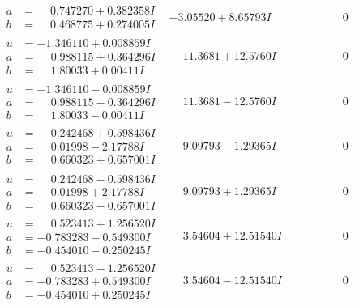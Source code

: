 \documentclass[1p]{elsarticle_modified}
\theoremstyle{definition}
\begin{document}
$$\begin{array}{c|c|c}
\begin{aligned}
a &= \phantom{-}0.747270 + 0.382358 I \\
b &= \phantom{-}0.468775 + 0.274005 I\end{aligned}
 & -3.05520 + 8.65793 I & \phantom{-0.000000 } 0 \\ \hline\begin{aligned}
u &= -1.346110 + 0.008859 I \\
a &= \phantom{-}0.988115 + 0.364296 I \\
b &= \phantom{-}1.80033 + 0.00411 I\end{aligned}
 & \phantom{-}11.3681 + 12.5760 I & \phantom{-0.000000 } 0 \\ \hline\begin{aligned}
u &= -1.346110 - 0.008859 I \\
a &= \phantom{-}0.988115 - 0.364296 I \\
b &= \phantom{-}1.80033 - 0.00411 I\end{aligned}
 & \phantom{-}11.3681 - 12.5760 I & \phantom{-0.000000 } 0 \\ \hline\begin{aligned}
u &= \phantom{-}0.242468 + 0.598436 I \\
a &= \phantom{-}0.01998 - 2.17788 I \\
b &= \phantom{-}0.660323 + 0.657001 I\end{aligned}
 & \phantom{-}9.09793 - 1.29365 I & \phantom{-0.000000 } 0 \\ \hline\begin{aligned}
u &= \phantom{-}0.242468 - 0.598436 I \\
a &= \phantom{-}0.01998 + 2.17788 I \\
b &= \phantom{-}0.660323 - 0.657001 I\end{aligned}
 & \phantom{-}9.09793 + 1.29365 I & \phantom{-0.000000 } 0 \\ \hline\begin{aligned}
u &= \phantom{-}0.523413 + 1.256520 I \\
a &= -0.783283 - 0.549300 I \\
b &= -0.454010 - 0.250245 I\end{aligned}
 & \phantom{-}3.54604 + 12.51540 I & \phantom{-0.000000 } 0 \\ \hline\begin{aligned}
u &= \phantom{-}0.523413 - 1.256520 I \\
a &= -0.783283 + 0.549300 I \\
b &= -0.454010 + 0.250245 I\end{aligned}
 & \phantom{-}3.54604 - 12.51540 I & \phantom{-0.000000 } 0 \\ \hline\begin{aligned}

\end{aligned}
\end{array}$$
\end{document}
